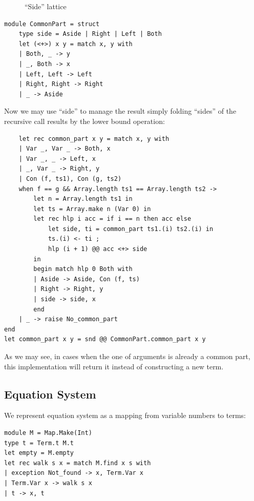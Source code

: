 \begin{figure}
    \centering
    \caption{``Side'' lattice}
    \label{fig:side-lattice}
\end{figure}

\begin{verbatim}
module CommonPart = struct
    type side = Aside | Right | Left | Both
    let (<+>) x y = match x, y with
    | Both, _ -> y
    | _, Both -> x
    | Left, Left -> Left
    | Right, Right -> Right
    | _ -> Aside
\end{verbatim}

Now we may use ``side'' to manage the result simply folding ``sides'' of the recursive call results by the lower bound operation:

\begin{verbatim}
    let rec common_part x y = match x, y with
    | Var _, Var _ -> Both, x
    | Var _, _ -> Left, x
    | _, Var _ -> Right, y
    | Con (f, ts1), Con (g, ts2)
    when f == g && Array.length ts1 == Array.length ts2 ->
        let n = Array.length ts1 in
        let ts = Array.make n (Var 0) in
        let rec hlp i acc = if i == n then acc else
            let side, ti = common_part ts1.(i) ts2.(i) in
            ts.(i) <- ti ;
            hlp (i + 1) @@ acc <+> side
        in
        begin match hlp 0 Both with
        | Aside -> Aside, Con (f, ts)
        | Right -> Right, y
        | side -> side, x
        end
    | _ -> raise No_common_part
end
let common_part x y = snd @@ CommonPart.common_part x y
\end{verbatim}

As we may see, in cases when the one of arguments is already a common part, this implementation will return it instead of constructing a new term.


\subsection{Equation System}

We represent equation system as a mapping from variable numbers to terms:
\begin{verbatim}
module M = Map.Make(Int)
type t = Term.t M.t
let empty = M.empty
let rec walk s x = match M.find x s with
| exception Not_found -> x, Term.Var x
| Term.Var x -> walk s x
| t -> x, t
\end{verbatim}

